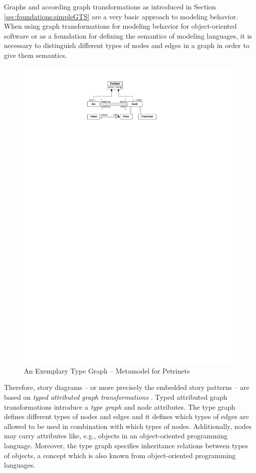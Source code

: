 Graphs and according graph transformations as introduced in Section \ref{sec:foundations:simpleGTS} are a very basic approach to modeling behavior.
When using graph transformations for modeling behavior for object-oriented software or as a foundation for defining the semantics of modeling languages,
it is necessary to distinguish different types of nodes and edges in a graph in order to give them semantics.

\begin{figure}[htb]
  \centering
  \includegraphics[scale=1]{figures/Petrinet}
  \caption{An Exemplary Type Graph -- Metamodel for Petrinets}
  \label{fig:PetrinetTypeGraph}
\end{figure}

Therefore, story diagrams -- or more precisely the embedded story patterns -- are based on \emph{typed attributed graph transformations} \cite{EEPT06}.
Typed attributed graph transformations introduce a \emph{type graph} and node attributes.
The type graph defines different types of nodes and edges and it defines which types of edges are allowed to be used in combination with which types of nodes.
Additionally, nodes may carry attributes like, e.g., objects in an object-oriented programming language.
Moreover, the type graph specifies inheritance relations between types of objects, a concept which is also known from object-oriented programming languages.

